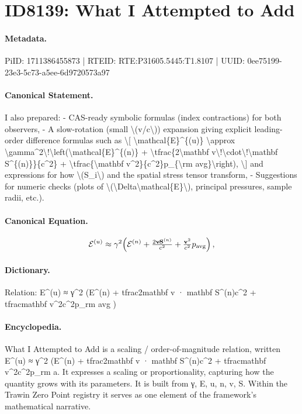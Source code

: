 \section*{ID8139: What I Attempted to Add}
\paragraph{Metadata.}
PiID: 1711386455873 | RTEID: RTE:P31605.5445:T1.8107 | UUID: 0ee75199-23e3-5c73-a5ee-6d9720573a97

\paragraph{Canonical Statement.}
I also prepared: - CAS-ready symbolic formulas (index contractions) for both observers, - A slow-rotation (small \textbackslash{}(v/c\textbackslash{})) expansion giving explicit leading-order difference formulas such as \textbackslash{}[ \textbackslash{}mathcal\{E\}\textasciicircum{}\{(u)\} \textbackslash{}approx \textbackslash{}gamma\textasciicircum{}2\textbackslash{}!\textbackslash{}left(\textbackslash{}mathcal\{E\}\textasciicircum{}\{(n)\} + \textbackslash{}tfrac\{2\textbackslash{}mathbf v\textbackslash{}!\textbackslash{}cdot\textbackslash{}!\textbackslash{}mathbf S\textasciicircum{}\{(n)\}\}\{c\textasciicircum{}2\} + \textbackslash{}tfrac\{\textbackslash{}mathbf v\textasciicircum{}2\}\{c\textasciicircum{}2\}p\_\{\textbackslash{}rm avg\}\textbackslash{}right), \textbackslash{}] and expressions for how \textbackslash{}(S\_i\textbackslash{}) and the spatial stress tensor transform, - Suggestions for numeric checks (plots of \textbackslash{}(\textbackslash{}Delta\textbackslash{}mathcal\{E\}\textbackslash{}), principal pressures, sample radii, etc.).

\paragraph{Canonical Equation.}
\[
\mathcal{E}^{(u)} \approx \gamma^2\!\left(\mathcal{E}^{(n)} + \tfrac{2\mathbf v\!\cdot\!\mathbf S^{(n)}}{c^2} + \tfrac{\mathbf v^2}{c^2}p_{\rm avg}\right),
\]

\paragraph{Dictionary.}
Relation: E\textasciicircum{}(u) ≈ γ\textasciicircum{}2 (E\textasciicircum{}(n) + tfrac2mathbf v · mathbf S\textasciicircum{}(n)c\textasciicircum{}2 + tfracmathbf v\textasciicircum{}2c\textasciicircum{}2p\_rm avg )

\paragraph{Encyclopedia.}
What I Attempted to Add is a scaling / order-of-magnitude relation, written E\textasciicircum{}(u) ≈ γ\textasciicircum{}2 (E\textasciicircum{}(n) + tfrac2mathbf v · mathbf S\textasciicircum{}(n)c\textasciicircum{}2 + tfracmathbf v\textasciicircum{}2c\textasciicircum{}2p\_rm a. It expresses a scaling or proportionality, capturing how the quantity grows with its parameters. It is built from γ, E, u, n, v, S. Within the Trawin Zero Point registry it serves as one element of the framework's mathematical narrative.
